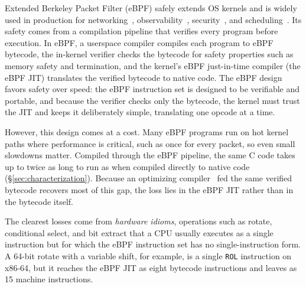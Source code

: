 Extended Berkeley Packet Filter (eBPF) safely extends OS kernels and is widely used in production for networking~\cite{cilium,katran}, observability~\cite{bpftrace,bcc}, security~\cite{krsi_lwn,tracee}, and scheduling~\cite{sched_ext_lwn}.
Its safety comes from a compilation pipeline that verifies every program before execution. In eBPF, a userspace compiler compiles each program to eBPF bytecode, the in-kernel verifier checks the bytecode for safety properties such as memory safety and termination, and the kernel's eBPF just-in-time compiler (the eBPF JIT) translates the verified bytecode to native code.
The eBPF design favors safety over speed: the eBPF instruction set is designed to be verifiable and portable, and because the verifier checks only the bytecode, the kernel must trust the JIT and keeps it deliberately simple, translating one opcode at a time.

However, this design comes at a cost.
Many eBPF programs run on hot kernel paths where performance is critical, such as once for every packet, so even small slowdowns matter.
Compiled through the eBPF pipeline, the same C code takes up to twice as long to run as when compiled directly to native code (\S\ref{sec:characterization}).
Because an optimizing compiler~\cite{zheng2025extending} fed the same verified bytecode recovers most of this gap, the loss lies in the eBPF JIT rather than in the bytecode itself.

The clearest losses come from \emph{hardware idioms}, operations such as rotate, conditional select, and bit extract that a CPU usually executes as a single instruction but for which the eBPF instruction set has no single-instruction form.
A 64-bit rotate with a variable shift, for example, is a single \texttt{ROL} instruction on x86-64, but it reaches the eBPF JIT as eight bytecode instructions and leaves as 15 machine instructions.


